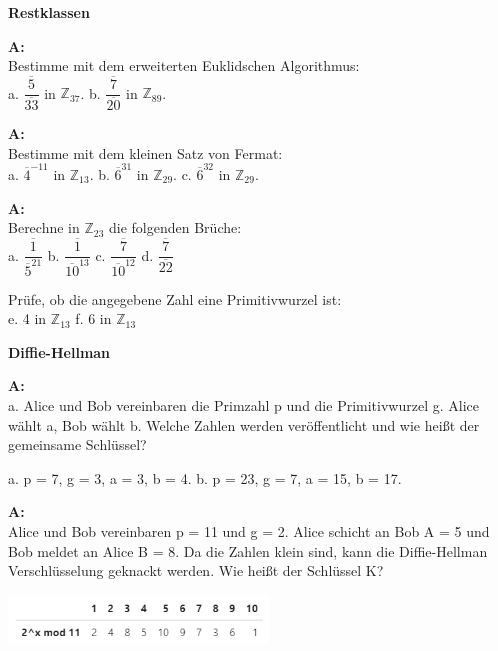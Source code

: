 \documentclass[landscape,twocolumn,a4paper]{article}
\begin{document}
 \textbf{Restklassen} \bigskip

\textbf{A:}   \\
Bestimme mit dem erweiterten Euklidschen Algorithmus: \\
 a.  $\dfrac{\overline{5}}{\overline{33}}$ in  $\mathbb{Z}_{37}$. \quad
 b.  $\dfrac{\overline{7}}{\overline{20}}$ in  $\mathbb{Z}_{89}$.
\bigskip {}

\textbf{A:}   \\
Bestimme mit dem kleinen Satz von Fermat: \\
 a.  $\overline{4}^{-11}$ in  $\mathbb{Z}_{13}$. \quad
 b.  $\overline{6}^{31}$ in  $\mathbb{Z}_{29}$. \quad
 c.  $ \overline{6}^{32}$ in  $\mathbb{Z}_{29}$. 
\bigskip {}

\textbf{A:}   \\
Berechne in $\mathbb{Z}_{23}$ die folgenden Brüche: \\
a.  $\dfrac{\overline{1}}{\overline{5}^{21}} $ \quad
b.  $\dfrac{\overline{1}}{\overline{10}^{13}} $ \quad
c.  $\dfrac{\overline{7}}{\overline{10}^{12}} $ \quad
d.  $\dfrac{\overline{7}}{\overline{22}} $ 

\bigskip
Prüfe, ob die angegebene Zahl eine Primitivwurzel ist: \\
 e. 4 in  $\mathbb{Z}_{13}$ \quad  f. 6 in  $\mathbb{Z}_{13}$
\bigskip {}

\textbf{Diffie-Hellman} \bigskip

\textbf{A:}   \\
a. Alice und Bob vereinbaren die Primzahl p und die Primitivwurzel g.
Alice wählt a, Bob wählt b. Welche Zahlen werden veröffentlicht und wie heißt der gemeinsame Schlüssel?

a.  p = 7, g = 3, a = 3, b = 4.  \quad
b.  p = 23, g = 7, a = 15, b = 17.

\bigskip {}

\textbf{A:}   \\
Alice und Bob vereinbaren p = 11 und g = 2. Alice schicht an Bob A = 5 und Bob meldet an Alice B = 8. Da die Zahlen klein sind, kann die Diffie-Hellman Verschlüsselung geknackt werden.  Wie heißt der Schlüssel K?

\includegraphics[width=6.9cm]{potenzen.png}
\bigskip {}
\end{document}
